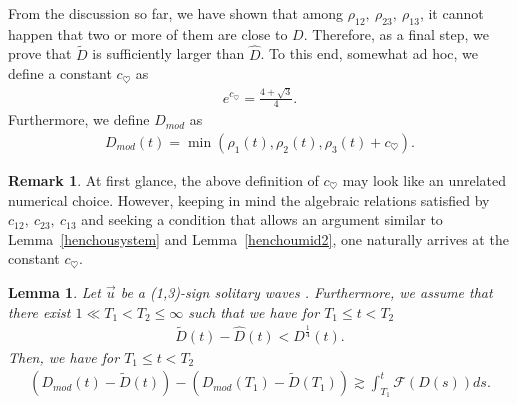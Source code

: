 \documentclass[reqno]{amsart}
\theoremstyle{plain}
\newtheorem{lemma}[theorem]{Lemma}
\theoremstyle{definition}
\newtheorem{remark}{Remark}[section]
\numberwithin{equation}{section}
\newcommand{\1}{\mathbbm{1}}
\begin{document}
From the discussion so far, we have shown that among $\rho_{12},\ \rho_{23},\ \rho_{13}$, it cannot happen that two or more of them are close to $D$.
Therefore, as a final step, we prove that $\tilde{D}$ is sufficiently larger than $\hat{D}$.
To this end, somewhat ad hoc, we define a constant $c_{\heartsuit}$ as
\begin{align}\label{cha-to}
e^{c_{\heartsuit}}=\frac{4+\sqrt{3}}{4}.
\end{align}
Furthermore, we define $D_{mod}$ as
\begin{align}\label{Dmoddef}
D_{mod}(t)=\min{(\rho_1(t),\rho_2(t),\rho_3(t)+c_{\heartsuit})}.
\end{align}
\begin{remark}
At first glance, the above definition of $c_{\heartsuit}$ may look like an unrelated numerical choice.
However, keeping in mind the algebraic relations satisfied by $c_{12},\ c_{23},\ c_{13}$ and seeking a condition that allows an argument similar to Lemma~\ref{henchousystem} and Lemma~\ref{henchoumid2}, one naturally arrives at the constant $c_{\heartsuit}$.
\end{remark}
\begin{lemma}\label{minhenchou}
Let $\vec{u}$ be a (1,3)-sign solitary waves . Furthermore, we assume that there exist $1\ll T_1< T_2\leq \infty$ such that we have for $T_1\leq t<T_2$
\begin{align}
\tilde{D}(t)-\hat{D}(t)<D^{\frac{1}{4}}(t). \label{lemass01253}
\end{align}
Then, we have for $T_1\leq t<T_2$
\begin{align}\label{Dmodes1}
\left(D_{mod}(t)-\tilde{D}(t)\right)-\left(D_{mod}(T_1)-\tilde{D}(T_1)\right)\gtrsim \int_{T_1}^t \mathcal{F}(D(s))ds.
\end{align}
\end{lemma}
\end{document}
